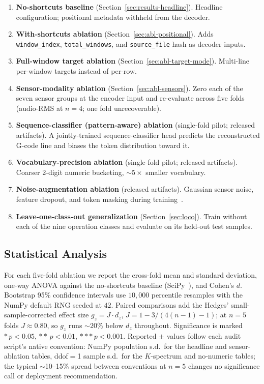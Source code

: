 \documentclass[sensors,article,submit,moreauthors,pdftex]{Definitions/mdpi}
\begin{document}
\begin{enumerate}
\item \textbf{No-shortcuts baseline} (Section~\ref{sec:results-headline}). Headline configuration; positional metadata withheld from the decoder.
\item \textbf{With-shortcuts ablation} (Section~\ref{sec:abl-positional}). Adds \texttt{window\_index}, \texttt{total\_windows}, and \texttt{source\_file} hash as decoder inputs.
\item \textbf{Full-window target ablation} (Section~\ref{sec:abl-target-mode}). Multi-line per-window targets instead of per-row.
\item \textbf{Sensor-modality ablation} (Section~\ref{sec:abl-sensors}). Zero each of the seven sensor groups at the encoder input and re-evaluate across five folds (audio-RMS at $n=4$; one fold unrecoverable).
\item \textbf{Sequence-classifier (pattern-aware) ablation} (single-fold pilot; released artifacts). A jointly-trained sequence-classifier head predicts the reconstructed G-code line and biases the token distribution toward it.
\item \textbf{Vocabulary-precision ablation} (single-fold pilot; released artifacts). Coarser 2-digit numeric bucketing, $\sim$$5\times$ smaller vocabulary.
\item \textbf{Noise-augmentation ablation} (released artifacts). Gaussian sensor noise, feature dropout, and token masking during training~\cite{srivastava2014dropout,jia2016deep,meyes2019ablation}.
\item \textbf{Leave-one-class-out generalization} (Section~\ref{sec:loco}). Train without each of the nine operation classes and evaluate on its held-out test samples.
\end{enumerate}

\subsection{Statistical Analysis}
\label{sec:stats}

For each five-fold ablation we report the cross-fold mean and standard deviation, one-way ANOVA against the no-shortcuts baseline (SciPy~\cite{virtanen2020scipy}), and Cohen's $d$. Bootstrap 95\% confidence intervals use $10{,}000$ percentile resamples with the NumPy default RNG seeded at $42$. Paired comparisons add the Hedges' small-sample-corrected effect size $g_z\!=\!J\!\cdot\!d_z$, $J\!=\!1\!-\!3/(4(n\!-\!1)\!-\!1)$; at $n\!=\!5$ folds $J\!\approx\!0.80$, so $g_z$ runs $\sim$$20\%$ below $d_z$ throughout. Significance is marked $\ast\,p<0.05$, $\ast\ast\,p<0.01$, $\ast\ast\ast\,p<0.001$. Reported $\pm$ values follow each audit script's native convention: NumPy population s.d.\ for the headline and sensor-ablation tables, ddof$=$1 sample s.d.\ for the $K$-spectrum and no-numeric tables; the typical $\sim$10--15\% spread between conventions at $n\!=\!5$ changes no significance call or deployment recommendation.
\end{document}
